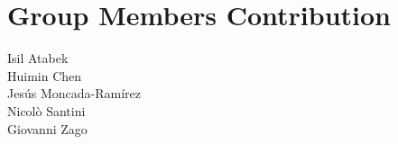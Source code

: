 \section{Group Members Contribution}

\begin{description}
    \item[Isil Atabek]

    \item[Huimin Chen]
    
    \item[Jes\'us Moncada-Ram\'irez]

    \item[Nicol\`o Santini]

    \item[Giovanni Zago]
\end{description}